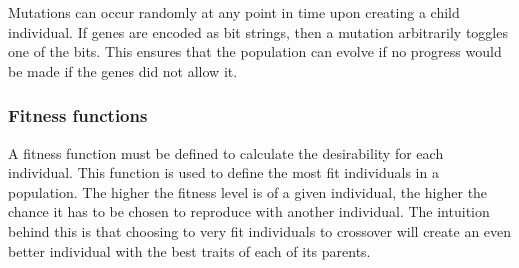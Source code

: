 

Mutations can occur randomly at any point in time upon creating a child individual. If genes are encoded as bit strings, then a mutation arbitrarily toggles one of the bits. This ensures that the population can evolve if no progress would be made if the genes did not allow it.

\subsubsection{Fitness functions}
A fitness function must be defined to calculate the desirability for each individual. This function is used to define the most fit individuals in a population. The higher the fitness level is of a given individual, the higher the chance it has to be chosen to reproduce with another individual. The intuition behind this is that choosing to very fit individuals to crossover will create an even better individual with the best traits of each of its parents.
